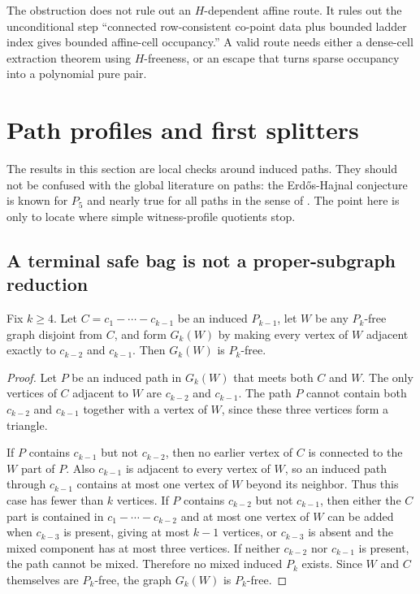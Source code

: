 \begin{remark}
The obstruction does not rule out an $H$-dependent affine route. It rules out the unconditional step ``connected row-consistent co-point data plus bounded ladder index gives bounded affine-cell occupancy.'' A valid route needs either a dense-cell extraction theorem using $H$-freeness, or an escape that turns sparse occupancy into a polynomial pure pair.
\end{remark}

\section{Path profiles and first splitters}

The results in this section are local checks around induced paths. They should not be confused with the global literature on paths: the Erd\H{o}s-Hajnal conjecture is known for $P_5$ and nearly true for all paths in the sense of \cite{NguyenScottSeymour2023DensityV,NguyenScottSeymour2026P5}. The point here is only to locate where simple witness-profile quotients stop.

\subsection{A terminal safe bag is not a proper-subgraph reduction}

\begin{proposition}\label{prop:terminal-blowup}
Fix $k\ge 4$. Let $C=c_1-\cdots-c_{k-1}$ be an induced $P_{k-1}$, let $W$ be any $P_k$-free graph disjoint from $C$, and form $G_k(W)$ by making every vertex of $W$ adjacent exactly to $c_{k-2}$ and $c_{k-1}$. Then $G_k(W)$ is $P_k$-free.
\end{proposition}

\begin{proof}
Let $P$ be an induced path in $G_k(W)$ that meets both $C$ and $W$. The only vertices of $C$ adjacent to $W$ are $c_{k-2}$ and $c_{k-1}$. The path $P$ cannot contain both $c_{k-2}$ and $c_{k-1}$ together with a vertex of $W$, since these three vertices form a triangle.

If $P$ contains $c_{k-1}$ but not $c_{k-2}$, then no earlier vertex of $C$ is connected to the $W$ part of $P$. Also $c_{k-1}$ is adjacent to every vertex of $W$, so an induced path through $c_{k-1}$ contains at most one vertex of $W$ beyond its neighbor. Thus this case has fewer than $k$ vertices. If $P$ contains $c_{k-2}$ but not $c_{k-1}$, then either the $C$ part is contained in $c_1-\cdots-c_{k-2}$ and at most one vertex of $W$ can be added when $c_{k-3}$ is present, giving at most $k-1$ vertices, or $c_{k-3}$ is absent and the mixed component has at most three vertices. If neither $c_{k-2}$ nor $c_{k-1}$ is present, the path cannot be mixed. Therefore no mixed induced $P_k$ exists. Since $W$ and $C$ themselves are $P_k$-free, the graph $G_k(W)$ is $P_k$-free.
\end{proof}

